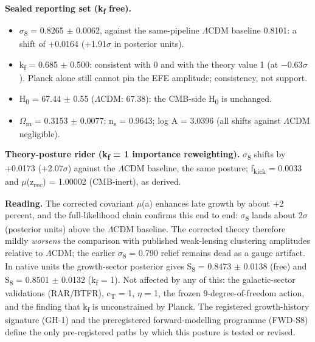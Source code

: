 \documentclass[11pt,a4paper]{article}
\begin{document}
\textbf{Sealed reporting set (k\textsubscript{f} free).}
\begin{itemize}
  \item $\sigma$\textsubscript{8} = 0.8265 $\pm$ 0.0062, against the same-pipeline $\Lambda$CDM baseline 0.8101: a shift of +0.0164 (+1.91$\sigma$ in posterior units).
  \item k\textsubscript{f} = 0.685 $\pm$ 0.500: consistent with 0 and with the theory value 1 (at $-$0.63$\sigma$). Planck alone still cannot pin the EFE amplitude; consistency, not support.
  \item H\textsubscript{0} = 67.44 $\pm$ 0.55 ($\Lambda$CDM: 67.38): the CMB-side H\textsubscript{0} is unchanged.
  \item $\Omega$\textsubscript{m} = 0.3153 $\pm$ 0.0077; n\textsubscript{s} = 0.9643; log A = 3.0396 (all shifts against $\Lambda$CDM negligible).
\end{itemize}

\textbf{Theory-posture rider (k\textsubscript{f} = 1 importance reweighting).} $\sigma$\textsubscript{8} shifts by +0.0173 (+2.07$\sigma$) against the $\Lambda$CDM baseline, the same posture; f\textsubscript{kick} = 0.0033 and $\mu$(z\textsubscript{rec}) = 1.00002 (CMB-inert), as derived.

\textbf{Reading.} The corrected covariant $\mu$(a) enhances late growth by about +2 percent, and the full-likelihood chain confirms this end to end: $\sigma$\textsubscript{8} lands about 2$\sigma$ (posterior units) above the $\Lambda$CDM baseline. The corrected theory therefore mildly \emph{worsens} the comparison with published weak-lensing clustering amplitudes relative to $\Lambda$CDM; the earlier $\sigma$\textsubscript{8} = 0.790 relief remains dead as a gauge artifact. In native units the growth-sector posterior gives S\textsubscript{8} = 0.8473 $\pm$ 0.0138 (free) and S\textsubscript{8} = 0.8501 $\pm$ 0.0132 (k\textsubscript{f} = 1). Not affected by any of this: the galactic-sector validations (RAR/\allowbreak{}BTFR), c\textsubscript{T} = 1, $\eta$ = 1, the frozen 9-degree-of-freedom action, and the finding that k\textsubscript{f} is unconstrained by Planck. The registered growth-history signature (GH-1) and the preregistered forward-modelling programme (FWD-S8) define the only pre-registered paths by which this posture is tested or revised.
\end{document}
